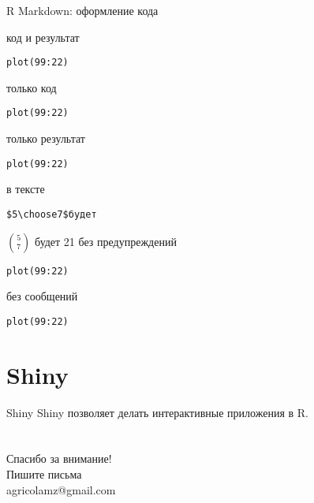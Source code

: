 \begin{frame}[fragile]{R Markdown: оформление кода}
\begin{multicols}{2}
\begin{itemize}
\mytem код и результат
\scriptsize 
\begin{alltt}
{}
plot(99:22)
{\color{red!13!blue}{```}}
\end{alltt}
\normalsize
\mytem только код
\scriptsize 
\begin{alltt}
{}
plot(99:22)
{\color{red!13!blue}{```}}
\end{alltt}
\normalsize
\mytem только результат
\scriptsize 
\begin{alltt}
{}
plot(99:22)
{\color{red!13!blue}{```}}
\end{alltt}
\normalsize
\columnbreak
\mytem в тексте
\tiny 
\begin{alltt}
\$5 \textbackslash choose 7\$ будет {\color{red!13!blue}{`r choose(7, 5)`}}
\end{alltt}
$5 \choose 7$ будет 21
\normalsize
\mytem без предупреждений
\scriptsize 
\begin{alltt}
{}
plot(99:22)
{\color{red!13!blue}{```}}
\end{alltt}
\normalsize
\mytem без сообщений
\scriptsize 
\begin{alltt}
{}
plot(99:22)
{\color{red!13!blue}{```}}
\end{alltt}
\normalsize
\end{itemize}
\end{multicols}
\end{frame}
\section{Shiny}
\begin{frame}[fragile]{Shiny}
Shiny позволяет делать интерактивные приложения в R.
\end{frame}
\section{}
\begin{frame}
{\huge Спасибо за внимание!\bigskip\\
\normalsize Пишите письма\\
agricolamz@gmail.com
\vspace{-130pt}}
\end{frame}
